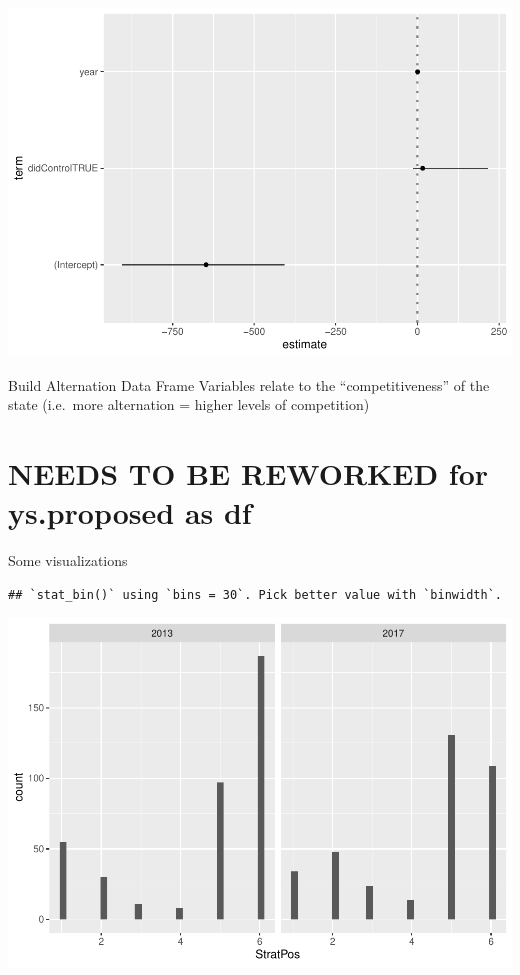 \documentclass[
]{article}
\newenvironment{Shaded}{\begin{snugshade}}{\end{snugshade}}
\newcommand{\KeywordTok}[1]{\textcolor[rgb]{0.13,0.29,0.53}{\textbf{#1}}}
\newcommand{\NormalTok}[1]{#1}
\newcommand{\OperatorTok}[1]{\textcolor[rgb]{0.81,0.36,0.00}{\textbf{#1}}}
\newcommand{\StringTok}[1]{\textcolor[rgb]{0.31,0.60,0.02}{#1}}
\begin{document}
\includegraphics{ProposalAnalysis_files/figure-latex/unnamed-chunk-8-3.pdf}

Build Alternation Data Frame Variables relate to the ``competitiveness''
of the state (i.e.~more alternation = higher levels of competition)

\hypertarget{needs-to-be-reworked-for-ys.proposed-as-df}{%
\section{NEEDS TO BE REWORKED for ys.proposed as
df}\label{needs-to-be-reworked-for-ys.proposed-as-df}}

Some visualizations

\begin{Shaded}
\end{Shaded}

\begin{verbatim}
## `stat_bin()` using `bins = 30`. Pick better value with `binwidth`.
\end{verbatim}

\includegraphics{ProposalAnalysis_files/figure-latex/unnamed-chunk-9-1.pdf}
\end{document}
